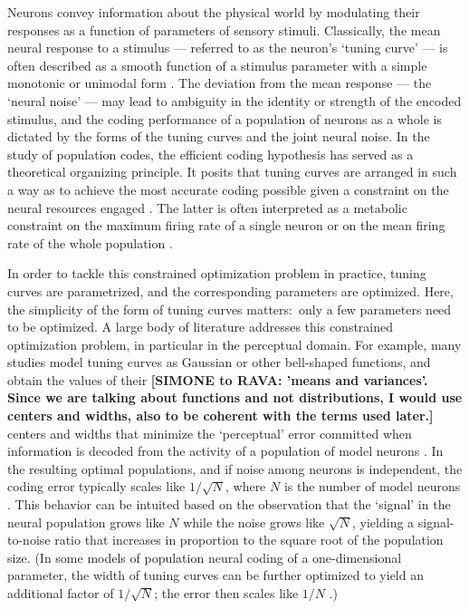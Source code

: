 \documentclass[a4paper]{article}%
\begin{document}
Neurons convey information about the physical world by modulating their
responses as a function of parameters of sensory stimuli. Classically, the
mean neural response to a stimulus --- referred to as the neuron's `tuning
curve' --- is often described as a smooth function of a stimulus parameter
with a simple monotonic or unimodal form
\cite[]{Hubel1959ReceptiveCortex,Georgopoulos1982OnCortex,Taube1990Head-directionAnalysis,Miller1991RepresentationInterneurons,Bremmer1997EyeMST,Dayan2001TheoreticalSystems,Kayaert2005TuningCortex}. The deviation from the mean response --- the `neural noise' --- may lead to
ambiguity in the identity or strength of the encoded stimulus, and the coding
performance of a population of neurons as a whole is dictated by the forms of
the tuning curves and the joint neural noise. In the study of population
codes, the efficient coding hypothesis has served as a theoretical organizing
principle. It posits that tuning curves are arranged in such a way as to
achieve the most accurate coding possible given a constraint on the neural
resources engaged
\cite[]{Barlow1961PossibleMessages,Atick1990TowardsProcessing,Lewicki2002EfficientSounds}. The latter is often interpreted as a metabolic constraint on the maximum
firing rate of a single neuron or on the mean firing rate of the whole
population
\cite[]{Zhang1999NeuronalBroaden,Bethge2002OptimalFails,Wang2016EfficientError}.

In order to tackle this constrained optimization problem in practice, tuning
curves are parametrized, and the corresponding parameters are optimized. Here,
the simplicity of the form of tuning curves matters:\ only a few parameters
need to be optimized. A large body of literature addresses this constrained
optimization problem, in particular in the perceptual domain. For example,
many studies model tuning curves as Gaussian or other bell-shaped functions,
and obtain the values of their \textbf{[SIMONE to RAVA: 'means and variances'. Since we are talking about functions and not distributions, I would use centers and widths, also to be coherent with the terms used later.]} centers and widths that minimize the
`perceptual' error committed when information is decoded from the activity of
a population of model neurons
\cite[]{Zhang1999NeuronalBroaden,Deneve1999ReadingObservers,Yaeli2010Error-basedNeurons,Ganguli2014EfficientPopulations,Fiscella2015VisualNeurons}. In the resulting optimal populations, and if noise among neurons is
independent, the coding error typically scales like $1/\sqrt{N}$, where $N$ is
the number of model neurons \cite[]{Seung1993SimpleCodes}. This behavior can be
intuited based on the observation that the `signal' in the neural population
grows like $N$ while the noise grows like $\sqrt{N}$, yielding a
signal-to-noise ratio that increases in proportion to the square root of the
population size. (In some models of population neural coding of a
one-dimensional parameter, the width of tuning curves can be further optimized
to yield an additional factor of $1/\sqrt{N}$; the error then scales like
$1/N$ \cite[]{Berens2011ReassessingFunctions,Kim2020SuperlinearCodes}.)
\end{document}
